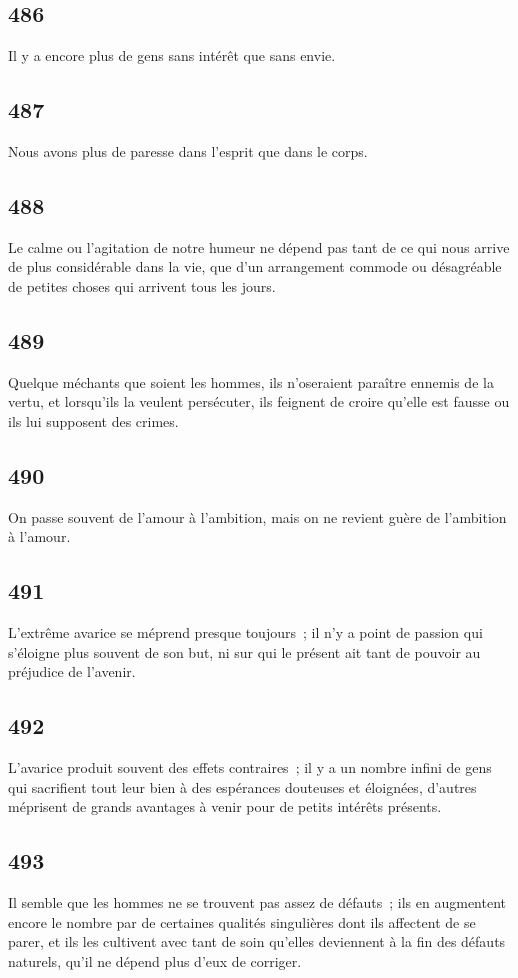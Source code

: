 \documentclass[french,twoside]{book} %
\begin{document}
\subsection[{486}]{ \textsc{486} }
\noindent Il y a encore plus de gens sans intérêt que sans envie.
\subsection[{487}]{ \textsc{487} }
\noindent Nous avons plus de paresse dans l’esprit que dans le corps.
\subsection[{488}]{ \textsc{488} }
\noindent Le calme ou l’agitation de notre humeur ne dépend pas tant de ce qui nous arrive de plus considérable dans la vie, que d’un arrangement commode ou désagréable de petites choses qui arrivent tous les jours.
\subsection[{489}]{ \textsc{489} }
\noindent Quelque méchants que soient les hommes, ils n’oseraient paraître ennemis de la vertu, et lorsqu’ils la veulent persécuter, ils feignent de croire qu’elle est fausse ou ils lui supposent des crimes.
\subsection[{490}]{ \textsc{490} }
\noindent On passe souvent de l’amour à l’ambition, mais on ne revient guère de l’ambition à l’amour.
\subsection[{491}]{ \textsc{491} }
\noindent L’extrême avarice se méprend presque toujours ; il n’y a point de passion qui s’éloigne plus souvent de son but, ni sur qui le présent ait tant de pouvoir au préjudice de l’avenir.
\subsection[{492}]{ \textsc{492} }
\noindent L’avarice produit souvent des effets contraires ; il y a un nombre infini de gens qui sacrifient tout leur bien à des espérances douteuses et éloignées, d’autres méprisent de grands avantages à venir pour de petits intérêts présents.
\subsection[{493}]{ \textsc{493} }
\noindent Il semble que les hommes ne se trouvent pas assez de défauts ; ils en augmentent encore le nombre par de certaines qualités singulières dont ils affectent de se parer, et ils les cultivent avec tant de soin qu’elles deviennent à la fin des défauts naturels, qu’il ne dépend plus d’eux de corriger.
\end{document}
